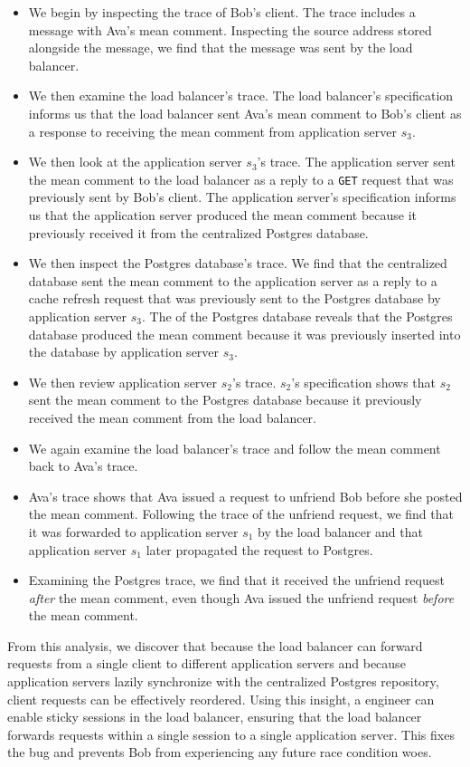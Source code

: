 \begin{itemize}
  \item
    We begin by inspecting the trace of Bob's \systemname{} client. The trace
    includes a message with Ava's mean comment. Inspecting the source address
    stored alongside the message, we find that the message was sent by the load
    balancer.
  \item
    We then examine the load balancer's trace. The load balancer's
    \watprovenance{} specification informs us that the load balancer sent Ava's
    mean comment to Bob's \systemname{} client as a response to receiving the
    mean comment from application server $s_3$.
  \item
    We then look at the application server $s_3$'s trace. The application
    server sent the mean comment to the load balancer as a reply to a
    \texttt{GET} request that was previously sent by Bob's \systemname{}
    client. The application server's \watprovenance{} specification informs us
    that the application server produced the mean comment because it previously
    received it from the centralized Postgres database.
  \item
    We then inspect the Postgres database's trace. We find that the centralized
    database sent the mean comment to the application server as a reply to a
    cache refresh request that was previously sent to the Postgres database by
    application server $s_3$. The \watprovenance{} of the Postgres database
    reveals that the Postgres database produced the mean comment because it was
    previously inserted into the database by application server $s_3$. 
  \item
    We then review application server $s_2$'s trace. $s_2$'s \watprovenance{}
    specification shows that $s_2$ sent the mean comment to the Postgres
    database because it previously received the mean comment from the load
    balancer.
  \item
    We again examine the load balancer's trace and follow the mean comment back
    to Ava's \systemname{} trace.
  \item
    Ava's trace shows that Ava issued a request to unfriend Bob before she
    posted the mean comment. Following the trace of the unfriend request, we
    find that it was forwarded to application server $s_1$ by the load
    balancer and that application server $s_1$ later propagated the request to
    Postgres.
  \item
    Examining the Postgres trace, we find that it received the unfriend request
    \emph{after} the mean comment, even though Ava issued the unfriend request
    \emph{before} the mean comment.
\end{itemize}

From this analysis, we discover that because the load balancer can forward
requests from a single client to different application servers and because
application servers lazily synchronize with the centralized Postgres
repository, client requests can be effectively reordered. Using this insight, a
\systemname{} engineer can enable sticky sessions in the load balancer,
ensuring that the load balancer forwards requests within a single session to a
single application server. This fixes the bug and prevents Bob from
experiencing any future race condition woes.
